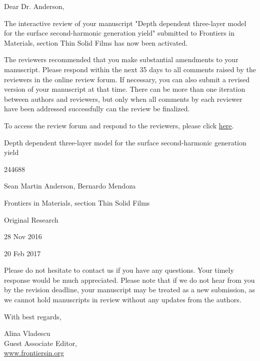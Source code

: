 \documentclass{article}
\begin{document}
Dear Dr. Anderson,

The interactive review of your manuscript "Depth dependent three-layer model for
the surface second-harmonic generation yield" submitted to Frontiers in
Materials, section Thin Solid Films has now been activated.

The reviewers recommended that you make substantial amendments to your
manuscript. Please respond within the next 35 days to all comments raised by the
reviewers in the online review forum. If necessary, you can also submit a
revised version of your manuscript at that time. There can be more than one
iteration between authors and reviewers, but only when all comments by each
reviewer have been addressed successfully can the review be finalized.

To access the review forum and respond to the reviewers, please click \href{http
://www.frontiersin.org/Review/EnterReviewForum.aspx?activationno=756b11ac-a551-4
580-8448-3afb497009d2}{here}.

\begin{description}[itemsep=-4pt]
\item[Manuscript title:] Depth dependent three-layer model for the surface
second-harmonic generation yield
\item[Manuscript ID:] 244688 
\item[Authors:] Sean Martin Anderson, Bernardo Mendoza 
\item[Journal:] Frontiers in Materials, section Thin Solid Films 
\item[Article type:] Original Research 
\item[Submitted on:] 28 Nov 2016 
\item[Interactive review started on:] 20 Feb 2017 
\end{description}

Please do not hesitate to contact us if you have any questions. Your timely
response would be much appreciated. Please note that if we do not hear from you
by the revision deadline, your manuscript may be treated as a new submission, as
we cannot hold manuscripts in review without any updates from the authors.

With best regards, 

Alina Vladescu\\
Guest Associate Editor,\\
\url{www.frontiersin.org}

\end{document}
